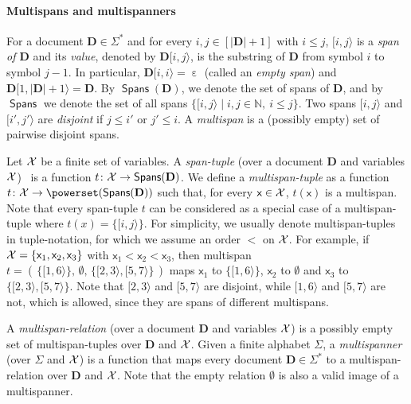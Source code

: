 \documentclass[
a4paper
]{article}
\theoremstyle{plain}
\theoremstyle{definition}
\theoremstyle{remark}
\DeclareMathOperator{\eword}{\varepsilon}
\DeclareMathOperator{\spans}{\textsf{Spans}}
\newcommand{\varset}{\mbox{\ensuremath{\mathcal{X}}}}
\newcommand{\doc}{\ensuremath{\mathbf{D}}}
\newcommand{\spann}[2]{\ensuremath{[#1,#2\rangle}}
\newcommand{\varsx}{\ensuremath{\textsf{x}}}
\begin{document}
\paragraph{Multispans and multispanners} For a document $\doc \in \Sigma^*$ and for every $i, j \in [|\doc| {+} 1]$ with $i\leq j$, $\spann{i}{j}$ is a \emph{span of $\doc$} and its \emph{value}, denoted by $\doc\spann{i}{j}$, is the substring of $\doc$ from symbol $i$ to symbol $j{-}1$. In particular, $\doc\spann{i}{i} = \eword$ (called an \emph{empty span}) and $\doc\spann{1}{|\doc|{+}1} = \doc$. By $\spans(\doc)$, we denote the set of spans of $\doc$, and by $\spans$ we denote the set of all spans $\{\spann{i}{j} \mid i,j \in \mathbb{N},\ i\leq j\}$. 
Two spans $\spann{i}{j}$ and $\spann{i'}{j'}$ are \emph{disjoint} if $j\leq i'$ or $j'\leq i$.
A \emph{multispan} is a (possibly empty) set of pairwise disjoint spans.

Let $\varset$ be a finite set of variables. A \emph{span-tuple} (over a document $\doc$ and variables $\varset$)~\cite{fagin2015document} is a function $t\colon \varset \to \spans(\doc)$. We define a \emph{multispan-tuple} as a function $t\colon \varset \to \powerset(\spans(\doc))$ such that, for every $\varsx \in \varset$, $t(\varsx)$ is a multispan.
Note that every span-tuple $t$ can be considered as a special case of a multispan-tuple where $t(x)
= \{\spann{i}{j}\}$. 
For simplicity, we usually denote multispan-tuples in tuple-notation, for which we assume an order $<$ on $\varset$. For example, if $\varset = \{\varsx_1, \varsx_2, \varsx_3\}$ with 
$\varsx_1< \varsx_2< \varsx_3$, then multispan $t = (\, \{\spann{1}{6}\}, \, \emptyset, \, \{\spann{2}{3}, \spann{5}{7}\} \, )$
maps $\varsx_1$ to $\{\spann{1}{6}\}$, $\varsx_2$ to $\emptyset$ and $\varsx_3$ to $\{\spann{2}{3}, \spann{5}{7}\}$. 
Note that $\spann{2}{3}$ and $\spann{5}{7}$ are disjoint, while $\spann{1}{6}$ and $\spann{5}{7}$ are not, which is allowed, since they are spans of different multispans. 

A \emph{multispan-relation} (over a document $\doc$ and variables $\varset$) is a possibly empty set of multispan-tuples over $\doc$ and $\varset$.
Given a finite alphabet $\Sigma$, 
a \emph{multispanner} (over $\Sigma$ and $\varset$) is a function that maps every document  $\doc \in \Sigma^*$ to a multispan-relation over $\doc$ and $\varset$. Note that the empty relation $\emptyset$ is also a valid image of a multi\-spanner. 
\end{document}
